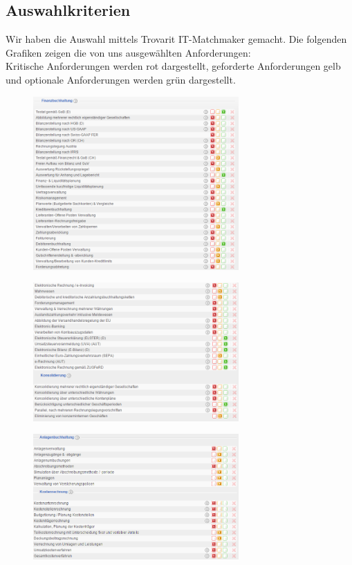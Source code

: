 \documentclass[12pt]{article}
\begin{document}
\subsection{Auswahlkriterien}
Wir haben die Auswahl mittels Trovarit IT-Matchmaker gemacht. Die folgenden Grafiken zeigen die von uns ausgewählten Anforderungen: \\
Kritische Anforderungen werden rot dargestellt, geforderte Anforderungen gelb und optionale Anforderungen werden grün dargestellt.
\begin{figure}[!h]
\centering
\includegraphics[width=0.7\textwidth]{images/tr1}
\end{figure}\FloatBarrier
\noindent
\begin{figure}[!h]
\centering
\includegraphics[width=0.7\textwidth]{images/tr2}
\end{figure}\FloatBarrier
\noindent
\begin{figure}[!h]
\centering
\includegraphics[width=0.7\textwidth]{images/tr3}
\end{figure}\FloatBarrier
\end{document}
